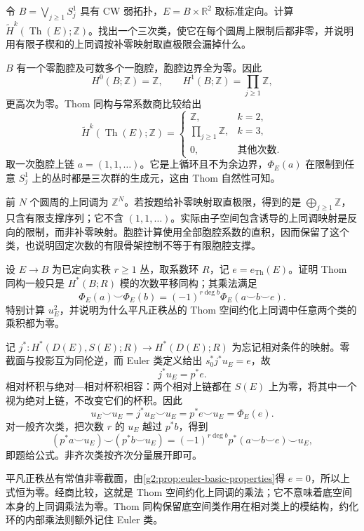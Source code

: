\begin{exercise}\label{g2:ex:infinite-thom-cochains}
	令 \(B=\bigvee_{j\ge1}S^1_j\) 具有 CW 弱拓扑，\(E=B\times\mathbb R^2\) 取标准定向。计算 \(\widetilde H^k(\operatorname{Th}(E);\mathbb Z)\)。找出一个三次类，使它在每个圆周上限制后都非零，并说明用有限子楔和的上同调按补零映射取直极限会漏掉什么。
\end{exercise}
\begin{solution}
	\(B\) 有一个零胞腔及可数多个一胞腔，胞腔边界全为零。因此
	\[
		H^0(B;\mathbb Z)=\mathbb Z,\qquad H^1(B;\mathbb Z)=\prod_{j\ge1}\mathbb Z,
	\]
	更高次为零。Thom 同构与常系数商比较给出
	\[
		\widetilde H^k(\operatorname{Th}(E);\mathbb Z)=
		\begin{cases}
			\mathbb Z,&k=2,\\
			\prod_{j\ge1}\mathbb Z,&k=3,\\
			0,&\text{其他次数}.
		\end{cases}
	\]
	取一次胞腔上链 \(a=(1,1,\ldots)\)。它是上循环且不为余边界，\(\Phi_E(a)\) 在限制到任意 \(S^1_j\) 上的丛时都是三次群的生成元，这由 Thom 自然性可知。

	前 \(N\) 个圆周的上同调为 \(\mathbb Z^N\)。若按题给补零映射取直极限，得到的是 \(\bigoplus_{j\ge1}\mathbb Z\)，只含有限支撑序列；它不含 \((1,1,\ldots)\)。实际由子空间包含诱导的上同调映射是反向的限制，而非补零映射。胞腔计算使用全部胞腔系数的直积，因而保留了这个类，也说明固定次数的有限骨架控制不等于有限胞腔支撑。
\end{solution}

\begin{exercise}\label{g2:ex:thom-space-product-euler}
	设 \(E\to B\) 为已定向实秩 \(r\ge1\) 丛，取系数环 \(R\)，记 \(e=e_{\mathrm{Th}}(E)\)。证明 Thom 同构一般只是 \(H^*(B;R)\) 模的次数平移同构；其乘法满足
	\[
		\Phi_E(a)\smile\Phi_E(b)=(-1)^{r\deg b}\Phi_E(a\smile b\smile e).
	\]
	特别计算 \(u_E^2\)，并说明为什么平凡正秩丛的 Thom 空间约化上同调中任意两个类的乘积都为零。
\end{exercise}
\begin{solution}
	记 \(j^*:H^*(D(E),S(E);R)\to H^*(D(E);R)\) 为忘记相对条件的映射。零截面与投影互为同伦逆，而 Euler 类定义给出 \(s_0^*j^*u_E=e\)，故
	\[
		j^*u_E=p^*e.
	\]
	相对杯积与绝对—相对杯积相容：两个相对上链都在 \(S(E)\) 上为零，将其中一个视为绝对上链，不改变它们的杯积。因此
	\[
		u_E\smile u_E=j^*u_E\smile u_E=p^*e\smile u_E=\Phi_E(e).
	\]
	对一般齐次类，把次数 \(r\) 的 \(u_E\) 越过 \(p^*b\)，得到
	\[
		(p^*a\smile u_E)\smile(p^*b\smile u_E)
		=(-1)^{r\deg b}p^*(a\smile b\smile e)\smile u_E,
	\]
	即题给公式。非齐次类按齐次分量展开即可。

	平凡正秩丛有常值非零截面，由\cref{g2:prop:euler-basic-properties}得 \(e=0\)，所以上式恒为零。经商比较，这就是 Thom 空间约化上同调的乘法；它不意味着底空间本身的上同调乘法为零。Thom 同构保留底空间类作用在相对类上的模结构，约化环的内部乘法则额外记住 Euler 类。
\end{solution}

